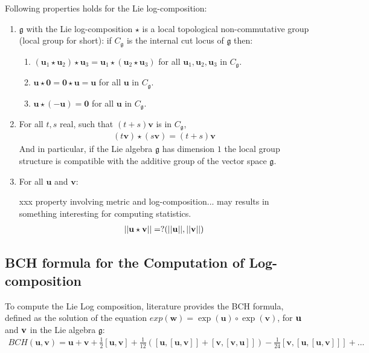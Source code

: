 \noindent
Following properties holds for the Lie log-composition:
\begin{enumerate}
	\item $\mathfrak{g} $ with the Lie log-composition $\star$ is a local topological non-commutative group (local group for short): if $C_{\mathfrak{g}}$ is the internal cut locus of $\mathfrak{g}$ then:
	\begin{enumerate}
		\item $(\mathbf{u}_{1}\star\mathbf{u}_{2}) \star \mathbf{u}_{3}
		= \mathbf{u}_{1}\star(\mathbf{u}_{2} \star \mathbf{u}_{3})$ for all $\mathbf{u}_{1}, \mathbf{u}_{2}, \mathbf{u}_{3}$ in $C_{\mathfrak{g}}$.
		\item $\mathbf{u}\star\mathbf{0}  = \mathbf{0}\star\mathbf{u} = \mathbf{u}$ for all $\mathbf{u}$ in $C_{\mathfrak{g}}$.
		\item $\mathbf{u}\star(-\mathbf{u} ) = \mathbf{0}$ for all $\mathbf{u}$ in $C_{\mathfrak{g}}$.
	\end{enumerate}
	\item For all $t,s$ real, such that $(t+s)\mathbf{v}$ is in $C_{\mathfrak{g}}$,
	\begin{align*}
	(t\mathbf{v})\star (s\mathbf{v}) = (t+s)\mathbf{v}
	\end{align*}
	And in particular, if the Lie algebra $\mathfrak{g}$ has dimension $1$ the local group structure is compatible with the additive group of the vector space $\mathfrak{g}$.
	\item For all $\mathbf{u}$ and $\mathbf{v}$: 
	
	\noindent
	xxx property involving metric and log-composition... may results in something interesting for computing statistics.
	\begin{align*}
	\vert\lvert \mathbf{u}\star \mathbf{v} \rvert\vert = ?( \vert\lvert \mathbf{u} \rvert\vert , \vert\lvert \mathbf{v} \rvert\vert)
	\end{align*}
\end{enumerate}

\subsection{BCH formula for the Computation of Log-composition}\label{se:bch_formula}

To compute the Lie Log composition, literature provides the BCH formula, defined as the solution of the equation $exp(\mathbf{w}) = \exp(\mathbf{u}) \circ \exp(\mathbf{v})$, for $\bf{u}$ and $\bf{v}$ in the Lie algebra $\mathfrak{g}$:
\begin{align*}
BCH(\mathbf{u},\mathbf{v}) 
= 
\mathbf{u} + \mathbf{v} + \frac{1}{2}[\mathbf{u},\mathbf{v}] + \frac{1}{12}([\mathbf{u},[\mathbf{u},\mathbf{v}]]
+ [\mathbf{v},[\mathbf{v},\mathbf{u}]]) - \frac{1}{24}[\mathbf{v},[\mathbf{u},[\mathbf{u},\mathbf{v}]]] +... 
\end{align*}

